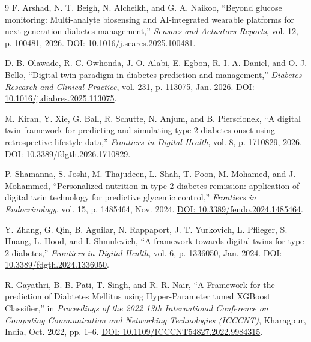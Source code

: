 \documentclass[12pt]{article}
\begin{document}
\begin{thebibliography}{9}
F. Arshad, N. T. Beigh, N. Alcheikh, and G. A. Naikoo, 
``Beyond glucose monitoring: Multi-analyte biosensing and AI-integrated wearable platforms for next-generation diabetes management,'' 
\emph{Sensors and Actuators Reports}, vol. 12, p. 100481, 2026. 
\href{https://doi.org/10.1016/j.seares.2025.100481}{DOI: 10.1016/j.seares.2025.100481}.

D. B. Olawade, R. C. Owhonda, J. O. Alabi, E. Egbon, R. I. A. Daniel, and O. J. Bello, 
``Digital twin paradigm in diabetes prediction and management,'' 
\emph{Diabetes Research and Clinical Practice}, vol. 231, p. 113075, Jan. 2026. 
\href{https://doi.org/10.1016/j.diabres.2025.113075}{DOI: 10.1016/j.diabres.2025.113075}.

M. Kiran, Y. Xie, G. Ball, R. Schutte, N. Anjum, and B. Pierscionek, 
``A digital twin framework for predicting and simulating type 2 diabetes onset using retrospective lifestyle data,'' 
\emph{Frontiers in Digital Health}, vol. 8, p. 1710829, 2026. 
\href{https://doi.org/10.3389/fdgth.2026.1710829}{DOI: 10.3389/fdgth.2026.1710829}.

P. Shamanna, S. Joshi, M. Thajudeen, L. Shah, T. Poon, M. Mohamed, and J. Mohammed, 
``Personalized nutrition in type 2 diabetes remission: application of digital twin technology for predictive glycemic control,'' 
\emph{Frontiers in Endocrinology}, vol. 15, p. 1485464, Nov. 2024. 
\href{https://doi.org/10.3389/fendo.2024.1485464}{DOI: 10.3389/fendo.2024.1485464}.

Y. Zhang, G. Qin, B. Aguilar, N. Rappaport, J. T. Yurkovich, L. Pflieger, S. Huang, L. Hood, and I. Shmulevich, 
``A framework towards digital twins for type 2 diabetes,'' 
\emph{Frontiers in Digital Health}, vol. 6, p. 1336050, Jan. 2024. 
\href{https://doi.org/10.3389/fdgth.2024.1336050}{DOI: 10.3389/fdgth.2024.1336050}.

R. Gayathri, B. B. Pati, T. Singh, and R. R. Nair, 
``A Framework for the prediction of Diabtetes Mellitus using Hyper-Parameter tuned XGBoost Classifier,'' 
in \emph{Proceedings of the 2022 13th International Conference on Computing Communication and Networking Technologies (ICCCNT)}, Kharagpur, India, Oct. 2022, pp. 1--6. 
\href{https://doi.org/10.1109/ICCCNT54827.2022.9984315}{DOI: 10.1109/ICCCNT54827.2022.9984315}.


\end{thebibliography}
\end{document}
